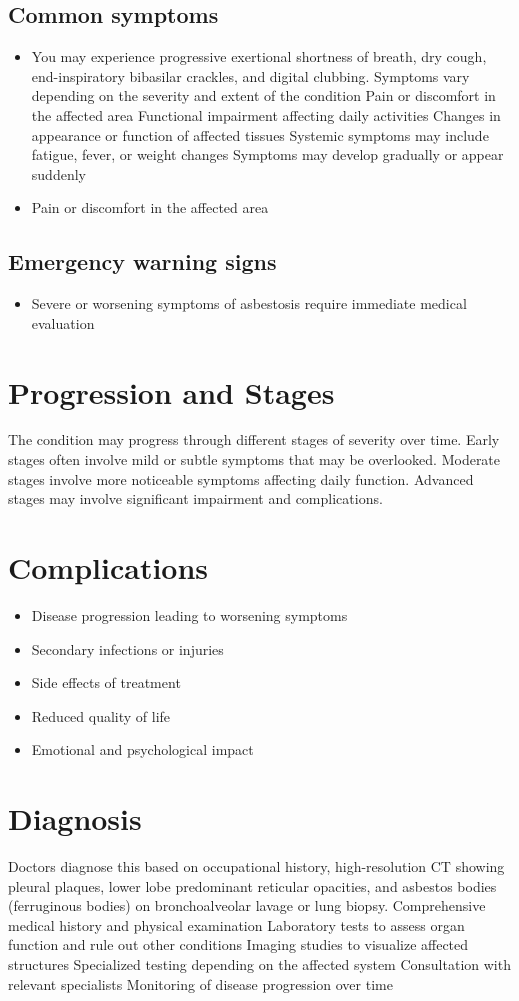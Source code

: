 \subsection{Common symptoms}
\begin{itemize}[noitemsep]
  \item You may experience progressive exertional shortness of breath, dry cough, end-inspiratory bibasilar crackles, and digital clubbing. Symptoms vary depending on the severity and extent of the condition Pain or discomfort in the affected area Functional impairment affecting daily activities Changes in appearance or function of affected tissues Systemic symptoms may include fatigue, fever, or weight changes Symptoms may develop gradually or appear suddenly
  \item Pain or discomfort in the affected area
  \end{itemize}

\subsection{Emergency warning signs}
\begin{itemize}[noitemsep]
  \item Severe or worsening symptoms of asbestosis require immediate medical evaluation
\end{itemize}
\section{Progression and Stages}
The condition may progress through different stages of severity over time. Early stages often involve mild or subtle symptoms that may be overlooked. Moderate stages involve more noticeable symptoms affecting daily function. Advanced stages may involve significant impairment and complications.
\section{Complications}
\begin{itemize}[noitemsep]
  \item Disease progression leading to worsening symptoms
  \item Secondary infections or injuries
  \item Side effects of treatment
  \item Reduced quality of life
  \item Emotional and psychological impact
\end{itemize}
\section{Diagnosis}
Doctors diagnose this based on occupational history, high-resolution CT showing pleural plaques, lower lobe predominant reticular opacities, and asbestos bodies (ferruginous bodies) on bronchoalveolar lavage or lung biopsy. Comprehensive medical history and physical examination Laboratory tests to assess organ function and rule out other conditions Imaging studies to visualize affected structures Specialized testing depending on the affected system Consultation with relevant specialists Monitoring of disease progression over time

